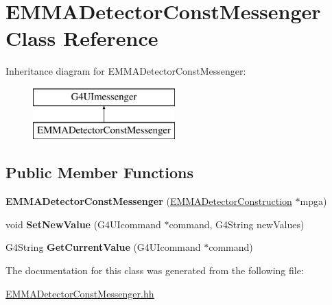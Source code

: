\hypertarget{classEMMADetectorConstMessenger}{\section{E\-M\-M\-A\-Detector\-Const\-Messenger Class Reference}
\label{classEMMADetectorConstMessenger}
}
Inheritance diagram for E\-M\-M\-A\-Detector\-Const\-Messenger\-:\begin{figure}[H]
\begin{center}
\leavevmode
\includegraphics[height=2.000000cm]{classEMMADetectorConstMessenger}
\end{center}
\end{figure}
\subsection*{Public Member Functions}
\begin{DoxyCompactItemize}
\item 
\hypertarget{classEMMADetectorConstMessenger_a895ac4d5b4cfdc81a9e781ef3105ca3c}{{\bfseries E\-M\-M\-A\-Detector\-Const\-Messenger} (\hyperlink{classEMMADetectorConstruction}{E\-M\-M\-A\-Detector\-Construction} $\ast$mpga)}\label{classEMMADetectorConstMessenger_a895ac4d5b4cfdc81a9e781ef3105ca3c}

\item 
\hypertarget{classEMMADetectorConstMessenger_aca55a1e0cd36c1fda8ad83480109347e}{void {\bfseries Set\-New\-Value} (G4\-U\-Icommand $\ast$command, G4\-String new\-Values)}\label{classEMMADetectorConstMessenger_aca55a1e0cd36c1fda8ad83480109347e}

\item 
\hypertarget{classEMMADetectorConstMessenger_a23723b91d3632cf722195ccb189f22cf}{G4\-String {\bfseries Get\-Current\-Value} (G4\-U\-Icommand $\ast$command)}\label{classEMMADetectorConstMessenger_a23723b91d3632cf722195ccb189f22cf}

\end{DoxyCompactItemize}


The documentation for this class was generated from the following file\-:\begin{DoxyCompactItemize}
\item 
\hyperlink{EMMADetectorConstMessenger_8hh}{E\-M\-M\-A\-Detector\-Const\-Messenger.\-hh}\end{DoxyCompactItemize}
